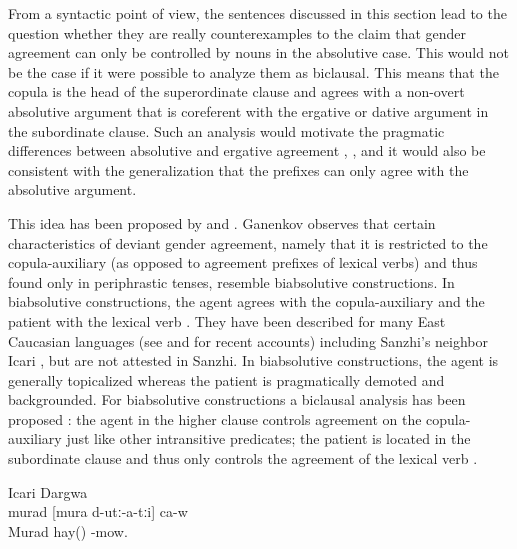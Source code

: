 From a syntactic point of view, the sentences discussed in this section lead to the question whether they are really counterexamples to the claim that gender agreement can only be controlled by nouns in the absolutive case. This would not be the case if it were possible to analyze them as biclausal. This means that the copula is the head of the superordinate clause and agrees with a non-overt absolutive argument that is coreferent with the ergative or dative argument in the subordinate clause. Such an analysis would motivate the pragmatic differences between absolutive and ergative agreement , , and it would also be consistent with the generalization that the prefixes can only agree with the absolutive argument. 

This idea has been proposed by \citet{Sumbatova2010} and \citet{GanenkovForthcoming}. Ganenkov observes that certain characteristics of deviant gender agreement, namely that it is restricted to the copula-auxiliary (as opposed to agreement prefixes of lexical verbs) and thus found only in periphrastic tenses, resemble biabsolutive constructions. In biabsolutive constructions, the agent agrees with the copula-auxiliary and the patient with the lexical verb . They have been described for many East Caucasian languages (see \citet{Forker2012a} and \citet{Gagliardietal.2014} for recent accounts) including Sanzhi's neighbor Icari \citet[156]{Sumbatova.Mutalov2003}, but are not attested in Sanzhi. In biabsolutive constructions, the agent is generally topicalized whereas the patient is pragmatically demoted and backgrounded. For biabsolutive constructions a biclausal analysis has been proposed \citep{Kazenin1998, Kazenin.Testelec1999, Kazenin2001}: the agent in the higher clause controls agreement on the copula-auxiliary just like other intransitive predicates; the patient is located in the subordinate clause and thus only controls the agreement of the lexical verb .

\begin{exe}
	\ex	Icari Dargwa \citep[156]{Sumbatova.Mutalov2003} \\\label{ex:As to Murad, he is mowing hay.}
	\gll	murad	[mura	d-utː-a-tːi]	ca-w\\
		Murad	hay(\tsc{npl})	-mow.	\\
	\glt	{}
\end{exe}

